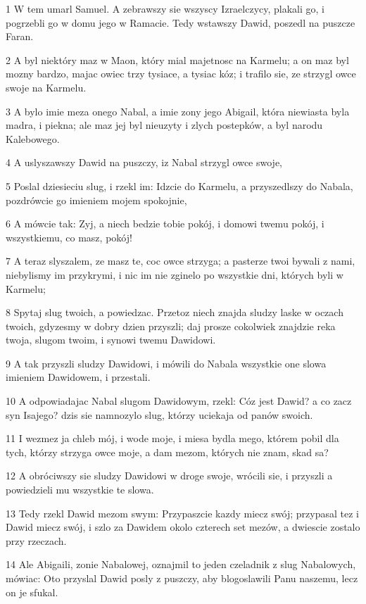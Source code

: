 \par 1 W tem umarl Samuel. A zebrawszy sie wszyscy Izraelczycy, plakali go, i pogrzebli go w domu jego w Ramacie. Tedy wstawszy Dawid, poszedl na puszcze Faran.
\par 2 A byl niektóry maz w Maon, który mial majetnosc na Karmelu; a on maz byl mozny bardzo, majac owiec trzy tysiace, a tysiac kóz; i trafilo sie, ze strzygl owce swoje na Karmelu.
\par 3 A bylo imie meza onego Nabal, a imie zony jego Abigail, która niewiasta byla madra, i piekna; ale maz jej byl nieuzyty i zlych postepków, a byl narodu Kalebowego.
\par 4 A uslyszawszy Dawid na puszczy, iz Nabal strzygl owce swoje,
\par 5 Poslal dziesieciu slug, i rzekl im: Idzcie do Karmelu, a przyszedlszy do Nabala, pozdrówcie go imieniem mojem spokojnie,
\par 6 A mówcie tak: Zyj, a niech bedzie tobie pokój, i domowi twemu pokój, i wszystkiemu, co masz, pokój!
\par 7 A teraz slyszalem, ze masz te, coc owce strzyga; a pasterze twoi bywali z nami, niebylismy im przykrymi, i nic im nie zginelo po wszystkie dni, których byli w Karmelu;
\par 8 Spytaj slug twoich, a powiedzac. Przetoz niech znajda sludzy laske w oczach twoich, gdyzesmy w dobry dzien przyszli; daj prosze cokolwiek znajdzie reka twoja, slugom twoim, i synowi twemu Dawidowi.
\par 9 A tak przyszli sludzy Dawidowi, i mówili do Nabala wszystkie one slowa imieniem Dawidowem, i przestali.
\par 10 A odpowiadajac Nabal slugom Dawidowym, rzekl: Cóz jest Dawid? a co zacz syn Isajego? dzis sie namnozylo slug, którzy uciekaja od panów swoich.
\par 11 I wezmez ja chleb mój, i wode moje, i miesa bydla mego, którem pobil dla tych, którzy strzyga owce moje, a dam mezom, których nie znam, skad sa?
\par 12 A obróciwszy sie sludzy Dawidowi w droge swoje, wrócili sie, i przyszli a powiedzieli mu wszystkie te slowa.
\par 13 Tedy rzekl Dawid mezom swym: Przypaszcie kazdy miecz swój; przypasal tez i Dawid miecz swój, i szlo za Dawidem okolo czterech set mezów, a dwiescie zostalo przy rzeczach.
\par 14 Ale Abigaili, zonie Nabalowej, oznajmil to jeden czeladnik z slug Nabalowych, mówiac: Oto przyslal Dawid posly z puszczy, aby blogoslawili Panu naszemu, lecz on je sfukal.
